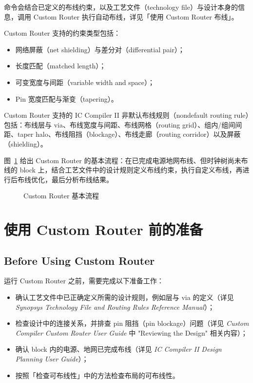  命令会结合已定义的布线约束，以及工艺文件（technology file）与设计本身的信息，调用 Custom Router 执行自动布线，详见「使用 Custom Router 布线」。

Custom Router 支持的约束类型包括：
\begin{itemize}
  \item 网络屏蔽（net shielding）与差分对（differential pair）；
  \item 长度匹配（matched length）；
  \item 可变宽度与间距（variable width and space）；
  \item Pin 宽度匹配与渐变（tapering）。
\end{itemize}

Custom Router 支持的 IC Compiler II 非默认布线规则（nondefault routing rule）包括：布线层与 via、布线宽度与间距、布线网格（routing grid）、组内/组间间距、taper halo、布线阻挡（blockage）、布线走廊（routing corridor）以及屏蔽（shielding）。

图~\ref{fig:custom-router-flow} 给出 Custom Router 的基本流程：在已完成电源地网布线、但时钟树尚未布线的 block 上，结合工艺文件中的设计规则定义布线约束，执行自定义布线，再进行后布线优化，最后分析布线结果。

\begin{figure}[htbp]
\centering
{}
\caption{Custom Router 基本流程}
\label{fig:custom-router-flow}
\end{figure}

\section{使用 Custom Router 前的准备}
\subsection*{Before Using Custom Router}

运行 Custom Router 之前，需要完成以下准备工作：
\begin{itemize}
  \item 确认工艺文件中已正确定义所需的设计规则，例如层与 via 的定义（详见 \textit{Synopsys Technology File and Routing Rules Reference Manual}）；
  \item 检查设计中的连接关系，并排查 pin 阻挡（pin blockage）问题（详见 \textit{Custom Compiler Custom Router User Guide} 中 "Reviewing the Design" 相关内容）；
  \item 确认 block 内的电源、地网已完成布线（详见 \textit{IC Compiler II Design Planning User Guide}）；
  \item 按照「检查可布线性」中的方法检查布局的可布线性。
\end{itemize}

